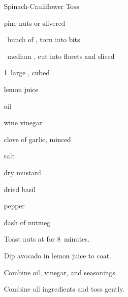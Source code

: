\begin{recipe}{Spinach-Cauliflower Toss}{}{}

\begin{ingredients}
\item \C{\half} pine nuts or slivered 
\item \half~bunch of , torn into bits
\item \half~medium , cut into florets and sliced \inch{1\quarter}
\item 1~large , cubed
\item lemon juice
\item {} oil
\item {} wine vinegar
\item clove of garlic, minced
\item \tp{\half} salt
\item \tp{\half} dry mustard
\item \tp{\half} dried basil
\item \tp{\quarter} pepper
\item dash of nutmeg
\end{ingredients}

\begin{directions}
\item Toast nuts at  for 8~minutes.
\item Dip avocado in lemon juice to coat.
\item Combine oil, vinegar, and seasonings.
\item Combine all ingredients and toss gently.
\end{directions}

\end{recipe}
